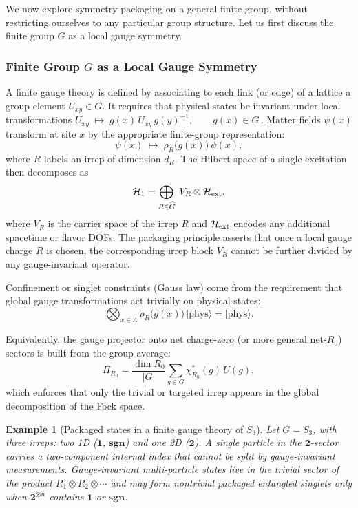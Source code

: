 \documentclass[12pt,a4paper]{article}
\newtheorem{example}{Example}
\begin{document}
We now explore symmetry packaging on a general finite group, without restricting ourselves to any particular group structure.
Let us first discuss the finite group $G$ as a local gauge symmetry.



\subsubsection{Finite Group $G$ as a Local Gauge Symmetry}

A finite gauge theory is defined by associating to each link (or edge) of a lattice a group element $U_{xy}\in G$.
It requires that physical states be invariant under local transformations
$ U_{xy} \;\mapsto\; g(x)\,U_{xy}\,g(y)^{-1}, \qquad g(x)\in G \,.$
Matter fields $\psi(x)$ transform at site $x$ by the appropriate finite-group representation:
$$
\psi(x)\;\mapsto\; \rho_R\bigl(g(x)\bigr)\,\psi(x),
$$
where $R$ labels an irrep of dimension $d_R$.
The Hilbert space of a single excitation then decomposes as
$$
\mathcal H_1
= \bigoplus_{R \in \widehat G} \;V_R \otimes \mathcal H_{\rm ext},
$$
where $V_R$ is the carrier space of the irrep $R$ and $\mathcal H_{\rm ext}$ encodes any additional spacetime or flavor DOFs.
The packaging principle asserts that once a local gauge charge $R$ is chosen, the corresponding irrep block $V_R$ cannot be further divided by any gauge-invariant operator.


Confinement or singlet constraints (Gauss law) come from the requirement that global gauge transformations act trivially on physical states:
$$
\bigotimes_{x\in\Lambda} \rho_R\bigl(g(x)\bigr)\,|\mathrm{phys}\rangle
= |\mathrm{phys}\rangle.
$$


Equivalently, the gauge projector onto net charge-zero (or more general net-$R_0$) sectors is built from the group average:
$$
\Pi_{R_0}
= \frac{\dim R_0}{|G|}\sum_{g\in G} \chi_{R_0}^*(g)\,U(g),
$$
which enforces that only the trivial or targeted irrep appears in the global decomposition of the Fock space.


\begin{example}[Packaged states in a finite gauge theory of $S_3$]
	Let $G=S_3$, with three irreps:
	two 1D ($\mathbf1$, $\mathbf{sgn}$) and one 2D ($\mathbf2$).
	A single particle in the $\mathbf2$-sector carries a two-component internal index that cannot be split by gauge-invariant measurements.
	Gauge-invariant multi-particle states live in the trivial sector of the product $R_1\otimes R_2\otimes\cdots$ and may form nontrivial packaged entangled singlets only when $\mathbf2^{\otimes n}$ contains $\mathbf1$ or $\mathbf{sgn}$.
\end{example}
\end{document}

